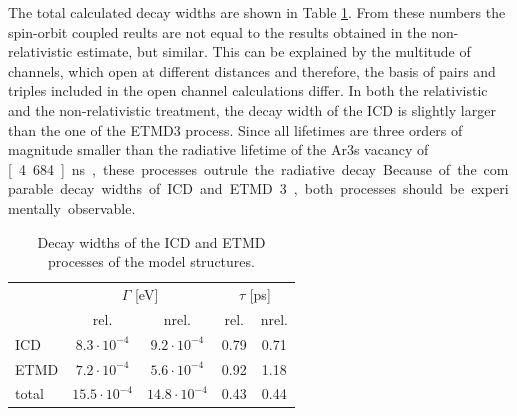 The total calculated decay widths are shown in Table
\ref{table:arxe_widths_model}. From these numbers the spin-orbit coupled
reults are not equal to the results obtained in the non-relativistic estimate,
but similar. This can be explained by the multitude of channels, which
open at different distances and therefore, the basis of pairs and triples
included in the open channel calculations differ. In both the relativistic and
the non-relativistic treatment,
the decay width of the \ac{ICD} is slightly larger than the one of the
\ac{ETMD}3 process. Since all lifetimes are three orders of magnitude smaller
than the radiative lifetime of the Ar3s vacancy of \unit[4.684]{ns},
these processes outrule the radiative decay.
Because of the comparable decay widths of \ac{ICD} and \ac{ETMD}3, both
processes should be experimentally observable.

\begin{table}[bt]
 \centering
 \caption{Decay widths of the ICD and ETMD processes of the model structures.}
 \begin{tabular}{lcccc}
  \toprule
          & \multicolumn{2}{c}{$\Gamma$ [eV]} & \multicolumn{2}{c}{$\tau$ [ps]}\\
          & rel.               & nrel.              & rel. & nrel. \\
  \midrule
   ICD    & $8.3\cdot 10^{-4}$ & $9.2\cdot 10^{-4}$ & 0.79 & 0.71\\
   ETMD   & $7.2\cdot 10^{-4}$ & $5.6\cdot 10^{-4}$ & 0.92 & 1.18\\
   total  & $15.5\cdot 10^{-4}$& $14.8\cdot 10^{-4}$& 0.43 & 0.44\\
  \bottomrule
 \end{tabular}
 \label{table:arxe_widths_model}
\end{table}

